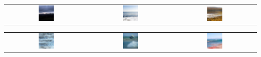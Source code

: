 \documentclass[12pt]{article}
\begin{document}
\begin{enumerate}[label=(\alph*)]
\begin{enumerate}[label=\roman*.]
        \begin{center}
        \begin{tabular}{c c c}
            \includegraphics[width=0.2\textwidth]{Images/Q2_binary/linear_sv_1.png} &
            \includegraphics[width=0.2\textwidth]{Images/Q2_binary/linear_sv_2.png} &
            \includegraphics[width=0.2\textwidth]{Images/Q2_binary/linear_sv_3.png} \\
        \end{tabular}
        \begin{tabular}{c c c}
            \includegraphics[width=0.2\textwidth]{Images/Q2_binary/linear_sv_4.png} &
            \includegraphics[width=0.2\textwidth]{Images/Q2_binary/linear_sv_5.png} &
            \includegraphics[width=0.2\textwidth]{Images/Q2_binary/linear_sv_6.png} \\
        \end{tabular}
        \end{center}


\end{enumerate}
\end{enumerate}
\end{document}
